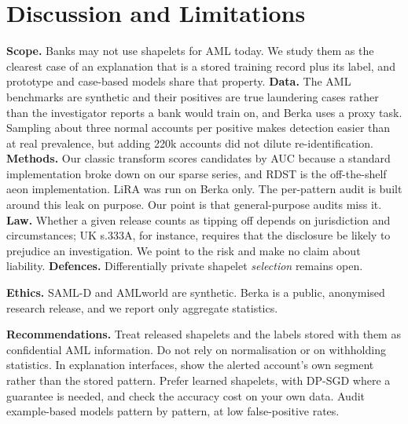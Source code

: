\documentclass[sigconf,anonymous]{acmart}
\begin{document}
\section{Discussion and Limitations}
\textbf{Scope.} Banks may not use shapelets for AML today. We study them as the clearest case of an explanation that is a stored training record plus its label, and prototype and case-based models share that property. \textbf{Data.} The AML benchmarks are synthetic and their positives are true laundering cases rather than the investigator reports a bank would train on, and Berka uses a proxy task. Sampling about three normal accounts per positive makes detection easier than at real prevalence, but adding 220k accounts did not dilute re-identification. \textbf{Methods.} Our classic transform scores candidates by AUC because a standard implementation broke down on our sparse series, and RDST is the off-the-shelf aeon implementation. LiRA was run on Berka only. The per-pattern audit is built around this leak on purpose. Our point is that general-purpose audits miss it. \textbf{Law.} Whether a given release counts as tipping off depends on jurisdiction and circumstances; UK s.333A, for instance, requires that the disclosure be likely to prejudice an investigation. We point to the risk and make no claim about liability. \textbf{Defences.} Differentially private shapelet \emph{selection} remains open.

\textbf{Ethics.} SAML-D and AMLworld are synthetic. Berka is a public, anonymised research release, and we report only aggregate statistics.

\textbf{Recommendations.} Treat released shapelets and the labels stored with them as confidential AML information. Do not rely on normalisation or on withholding statistics. In explanation interfaces, show the alerted account's own segment rather than the stored pattern. Prefer learned shapelets, with DP-SGD where a guarantee is needed, and check the accuracy cost on your own data. Audit example-based models pattern by pattern, at low false-positive rates.
\end{document}
